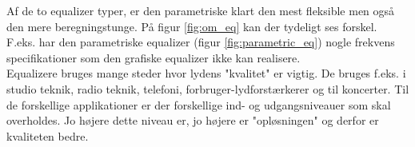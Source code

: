 Af de to equalizer typer, er den parametriske klart den mest fleksible men også den mere beregningstunge. På figur \ref{fig:om_eq} kan der tydeligt ses forskel. F.eks. har den parametriske equalizer (figur \ref{fig:parametric_eq}) nogle frekvens specifikationer som den grafiske equalizer ikke kan realisere.\\

Equalizere bruges mange steder hvor lydens "kvalitet" er vigtig. 
De bruges f.eks. i studio teknik, radio teknik, telefoni, forbruger-lydforstærkerer og til koncerter. 
Til de forskellige applikationer er der forskellige ind- og udgangsniveauer som skal overholdes. 
Jo højere dette niveau er, jo højere er "opløsningen" og derfor er kvaliteten bedre. 
